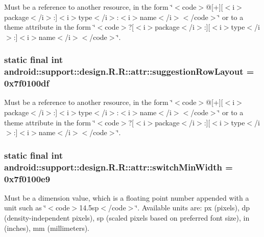 Must be a reference to another resource, in the form \char`\"{}$<$code$>$@\mbox{[}+\mbox{]}\mbox{[}$<$i$>$package$<$/i$>$:\mbox{]}$<$i$>$type$<$/i$>$:$<$i$>$name$<$/i$>$$<$/code$>$\char`\"{} or to a theme attribute in the form \char`\"{}$<$code$>$?\mbox{[}$<$i$>$package$<$/i$>$:\mbox{]}\mbox{[}$<$i$>$type$<$/i$>$:\mbox{]}$<$i$>$name$<$/i$>$$<$/code$>$\char`\"{}. \hypertarget{classandroid_1_1support_1_1design_1_1_r_1_1attr_2e599e5b56ab0d78734db65424d666ed}{
\subsubsection[{suggestionRowLayout}]{\setlength{\rightskip}{0pt plus 5cm}static final int android::support::design.R.R::attr::suggestionRowLayout = 0x7f0100df}}
\label{classandroid_1_1support_1_1design_1_1_r_1_1attr_2e599e5b56ab0d78734db65424d666ed}


Must be a reference to another resource, in the form \char`\"{}$<$code$>$@\mbox{[}+\mbox{]}\mbox{[}$<$i$>$package$<$/i$>$:\mbox{]}$<$i$>$type$<$/i$>$:$<$i$>$name$<$/i$>$$<$/code$>$\char`\"{} or to a theme attribute in the form \char`\"{}$<$code$>$?\mbox{[}$<$i$>$package$<$/i$>$:\mbox{]}\mbox{[}$<$i$>$type$<$/i$>$:\mbox{]}$<$i$>$name$<$/i$>$$<$/code$>$\char`\"{}. \hypertarget{classandroid_1_1support_1_1design_1_1_r_1_1attr_3eb6004344b04c24ae60af24ec556aa7}{
\subsubsection[{switchMinWidth}]{\setlength{\rightskip}{0pt plus 5cm}static final int android::support::design.R.R::attr::switchMinWidth = 0x7f0100e9}}
\label{classandroid_1_1support_1_1design_1_1_r_1_1attr_3eb6004344b04c24ae60af24ec556aa7}


Must be a dimension value, which is a floating point number appended with a unit such as \char`\"{}$<$code$>$14.5sp$<$/code$>$\char`\"{}. Available units are: px (pixels), dp (density-independent pixels), sp (scaled pixels based on preferred font size), in (inches), mm (millimeters). 

